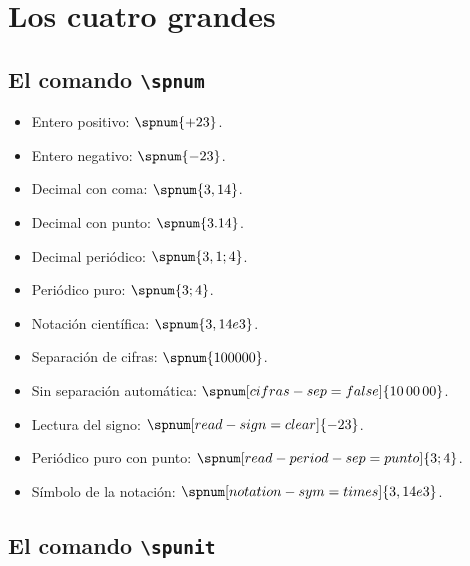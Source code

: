 \documentclass{article}
\begin{document}
\section*{Los cuatro grandes}

\subsection*{El comando \texttt{\textbackslash spnum}}

\begin{itemize}
  \item Entero positivo: $\spnum{+23}$.
  \item Entero negativo: $\spnum{-23}$.
  \item Decimal con coma: $\spnum{3,14}$.
  \item Decimal con punto: $\spnum{3.14}$.
  \item Decimal periódico: $\spnum{3,1;4}$.
  \item Periódico puro: $\spnum{3;4}$.
  \item Notación científica: $\spnum{3,14e3}$.
  \item Separación de cifras: $\spnum{100000}$.
  \item Sin separación automática: $\spnum[cifras-sep=false]{10\,00\,00}$.
  \item Lectura del signo: $\spnum[read-sign=clear]{-23}$.
  \item Periódico puro con punto: $\spnum[read-period-sep=punto]{3;4}$.
  \item Símbolo de la notación: $\spnum[notation-sym=times]{3,14e3}$.
\end{itemize}

\subsection*{El comando \texttt{\textbackslash spunit}}
\end{document}
